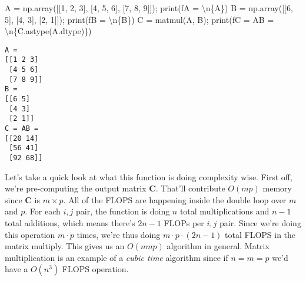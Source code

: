 \documentclass[
  letterpaper,
  DIV=11,
  numbers=noendperiod]{scrreprt}
\newenvironment{Shaded}{\begin{snugshade}}{\end{snugshade}}
\newcommand{\BuiltInTok}[1]{\textcolor[rgb]{0.00,0.23,0.31}{#1}}
\newcommand{\CharTok}[1]{\textcolor[rgb]{0.13,0.47,0.30}{#1}}
\newcommand{\DecValTok}[1]{\textcolor[rgb]{0.68,0.00,0.00}{#1}}
\newcommand{\NormalTok}[1]{\textcolor[rgb]{0.00,0.23,0.31}{#1}}
\newcommand{\OperatorTok}[1]{\textcolor[rgb]{0.37,0.37,0.37}{#1}}
\newcommand{\SpecialCharTok}[1]{\textcolor[rgb]{0.37,0.37,0.37}{#1}}
\newcommand{\SpecialStringTok}[1]{\textcolor[rgb]{0.13,0.47,0.30}{#1}}
\begin{document}
\begin{Shaded}
\begin{Highlighting}[]
\NormalTok{A }\OperatorTok{=}\NormalTok{ np.array([[}\DecValTok{1}\NormalTok{, }\DecValTok{2}\NormalTok{, }\DecValTok{3}\NormalTok{], [}\DecValTok{4}\NormalTok{, }\DecValTok{5}\NormalTok{, }\DecValTok{6}\NormalTok{], [}\DecValTok{7}\NormalTok{, }\DecValTok{8}\NormalTok{, }\DecValTok{9}\NormalTok{]])}\OperatorTok{;} \BuiltInTok{print}\NormalTok{(}\SpecialStringTok{f\textquotesingle{}A = }\CharTok{\textbackslash{}n}\SpecialCharTok{\{}\NormalTok{A}\SpecialCharTok{\}}\SpecialStringTok{\textquotesingle{}}\NormalTok{)}
\NormalTok{B }\OperatorTok{=}\NormalTok{ np.array([[}\DecValTok{6}\NormalTok{, }\DecValTok{5}\NormalTok{], [}\DecValTok{4}\NormalTok{, }\DecValTok{3}\NormalTok{], [}\DecValTok{2}\NormalTok{, }\DecValTok{1}\NormalTok{]])}\OperatorTok{;} \BuiltInTok{print}\NormalTok{(}\SpecialStringTok{f\textquotesingle{}B = }\CharTok{\textbackslash{}n}\SpecialCharTok{\{}\NormalTok{B}\SpecialCharTok{\}}\SpecialStringTok{\textquotesingle{}}\NormalTok{)}
\NormalTok{C }\OperatorTok{=}\NormalTok{ matmul(A, B)}\OperatorTok{;} \BuiltInTok{print}\NormalTok{(}\SpecialStringTok{f\textquotesingle{}C = AB = }\CharTok{\textbackslash{}n}\SpecialCharTok{\{}\NormalTok{C}\SpecialCharTok{.}\NormalTok{astype(A.dtype)}\SpecialCharTok{\}}\SpecialStringTok{\textquotesingle{}}\NormalTok{)}
\end{Highlighting}
\end{Shaded}

\begin{verbatim}
A = 
[[1 2 3]
 [4 5 6]
 [7 8 9]]
B = 
[[6 5]
 [4 3]
 [2 1]]
C = AB = 
[[20 14]
 [56 41]
 [92 68]]
\end{verbatim}

Let's take a quick look at what this function is doing complexity wise.
First off, we're pre-computing the output matrix \(\mathbf{C}\). That'll
contribute \(O(mp)\) memory since \(\mathbf{C}\) is \(m \times p\). All
of the FLOPS are happening inside the double loop over \(m\) and \(p\).
For each \(i,j\) pair, the function is doing \(n\) total multiplications
and \(n-1\) total additions, which means there's \(2n-1\) FLOPs per
\(i,j\) pair. Since we're doing this operation \(m \cdot p\) times,
we're thus doing \(m \cdot p \cdot (2n-1)\) total FLOPS in the matrix
multiply. This gives us an \(O(nmp)\) algorithm in general. Matrix
multiplication is an example of a \emph{cubic time} algorithm since if
\(n=m=p\) we'd have a \(O(n^3)\) FLOPS operation.
\end{document}
